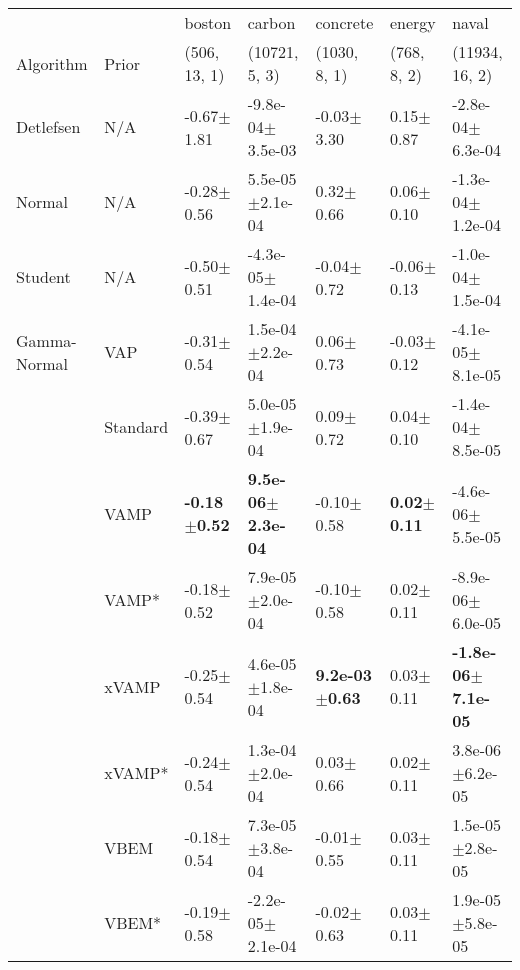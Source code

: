 \begin{tabular}{lllllll}
\toprule
             &       &                   boston &                        carbon &                   concrete &                  energy &                          naval \\
Algorithm & Prior& (506, 13, 1)& (10721, 5, 3)& (1030, 8, 1)& (768, 8, 2)& (11934, 16, 2)\\
\midrule
Detlefsen & N/A &           -0.67$\pm$1.81 &          -9.8e-04$\pm$3.5e-03 &             -0.03$\pm$3.30 &           0.15$\pm$0.87 &           -2.8e-04$\pm$6.3e-04 \\
Normal & N/A &           -0.28$\pm$0.56 &           5.5e-05$\pm$2.1e-04 &              0.32$\pm$0.66 &           0.06$\pm$0.10 &           -1.3e-04$\pm$1.2e-04 \\
Student & N/A &           -0.50$\pm$0.51 &          -4.3e-05$\pm$1.4e-04 &             -0.04$\pm$0.72 &          -0.06$\pm$0.13 &           -1.0e-04$\pm$1.5e-04 \\
Gamma-Normal & VAP &           -0.31$\pm$0.54 &           1.5e-04$\pm$2.2e-04 &              0.06$\pm$0.73 &          -0.03$\pm$0.12 &           -4.1e-05$\pm$8.1e-05 \\
             & Standard &           -0.39$\pm$0.67 &           5.0e-05$\pm$1.9e-04 &              0.09$\pm$0.72 &           0.04$\pm$0.10 &           -1.4e-04$\pm$8.5e-05 \\
             & VAMP &  \textbf{-0.18$\pm$0.52} &  \textbf{9.5e-06$\pm$2.3e-04} &             -0.10$\pm$0.58 &  \textbf{0.02$\pm$0.11} &           -4.6e-06$\pm$5.5e-05 \\
             & VAMP* &           -0.18$\pm$0.52 &           7.9e-05$\pm$2.0e-04 &             -0.10$\pm$0.58 &           0.02$\pm$0.11 &           -8.9e-06$\pm$6.0e-05 \\
             & xVAMP &           -0.25$\pm$0.54 &           4.6e-05$\pm$1.8e-04 &  \textbf{9.2e-03$\pm$0.63} &           0.03$\pm$0.11 &  \textbf{-1.8e-06$\pm$7.1e-05} \\
             & xVAMP* &           -0.24$\pm$0.54 &           1.3e-04$\pm$2.0e-04 &              0.03$\pm$0.66 &           0.02$\pm$0.11 &            3.8e-06$\pm$6.2e-05 \\
             & VBEM &           -0.18$\pm$0.54 &           7.3e-05$\pm$3.8e-04 &             -0.01$\pm$0.55 &           0.03$\pm$0.11 &            1.5e-05$\pm$2.8e-05 \\
             & VBEM* &           -0.19$\pm$0.58 &          -2.2e-05$\pm$2.1e-04 &             -0.02$\pm$0.63 &           0.03$\pm$0.11 &            1.9e-05$\pm$5.8e-05 \\

\end{tabular}
